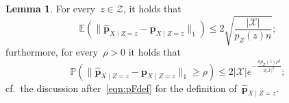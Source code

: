 \documentclass[11pt, a4paper]{article}
\theoremstyle{definition}
\newtheorem{lemma}[theorem]{Lemma}
\begin{document}
%
\begin{lemma}\label{lem:manyin}
For every~$z \in \mathcal{Z}$, it holds that
%
\begin{equation}\label{eqn:morein}
\mathbb{E}\left( \|\hat{\bm{p}}_{X\mid Z = z} - \bm{p}_{X\mid Z = z}\|_1\right) \leq 2 \sqrt{ \frac{|\mathcal{X}| }{p_Z(z) n}};
\end{equation}
%
furthermore, for every~$\rho > 0$ it holds that
%
\begin{equation}\label{eqn:pconc}
\mathbb{P}\left( \|\hat{\bm{p}}_{X\mid Z = z} - \bm{p}_{X\mid Z = z}\|_1 \geq \rho \right)  \leq  2 |\mathcal{X}| e^{-\frac{np_Z(z)\rho^2}{2|\mathcal{X}|^2}};
\end{equation}
%
cf.~the discussion after~\eqref{eqn:pFdef} for the definition of~$\hat{\bm{p}}_{X\mid Z = z}$. 
\end{lemma}
\end{document}
